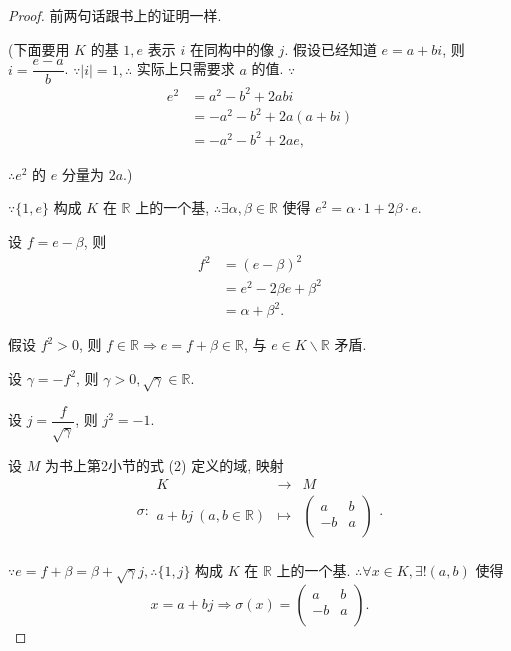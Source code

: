 \documentclass[UTF8]{ctexart}
\begin{document}
\begin{proof}
    前两句话跟书上的证明一样.

    (下面要用 $K$ 的基 $1,e$ 表示 $i$ 在同构中的像 $j$. 假设已经知道 $e=a+bi$, 则 $i=\dfrac{e-a}{b}$. $\because|i|=1,\therefore$ 实际上只需要求 $a$ 的值. $\because$
    \begin{align*}
        e^2 & =a^2-b^2+2abi \\
        & =-a^2-b^2+2a(a+bi) \\
        & =-a^2-b^2+2ae,
    \end{align*}

    $\therefore e^2$ 的 $e$ 分量为 $2a$.)

    $\because\{1,e\}$ 构成 $K$ 在 $\mathbb{R}$ 上的一个基, $\therefore\exists\alpha,\beta\in\mathbb{R}$ 使得 $e^2=\alpha\cdot1+2\beta\cdot e$.

    设 $f=e-\beta$, 则
    \begin{align*}
        f^2 & =(e-\beta)^2 \\
        & =e^2-2\beta e+\beta^2 \\
        & =\alpha+\beta^2.
    \end{align*}

    假设 $f^2>0$, 则 $f\in\mathbb{R}\Rightarrow e=f+\beta\in\mathbb{R}$, 与 $e\in K\backslash\mathbb{R}$ 矛盾.

    设 $\gamma=-f^2$, 则 $\gamma>0,\sqrt{\gamma}\in\mathbb{R}$.

    设 $j=\dfrac{f}{\sqrt{\gamma}}$, 则 $j^2=-1$.

    设 $M$ 为书上第2小节的式 (2) 定义的域, 映射
    \[\sigma:\begin{array}{rcl}
        K & \to & M \\[6pt]
        a+bj\ (a,b\in\mathbb{R}) & \mapsto & \begin{pmatrix}
            a & b \\
            -b & a \\
        \end{pmatrix} \\
    \end{array}.\]

    $\because e=f+\beta=\beta+\sqrt{\gamma}j,\therefore\{1,j\}$ 构成 $K$ 在 $\mathbb{R}$ 上的一个基. $\therefore\forall x\in K,\exists!(a,b)$ 使得
    \[x=a+bj\Rightarrow\sigma(x)=\begin{pmatrix}
            a & b \\
            -b & a \\
        \end{pmatrix}.\]


\end{proof}
\end{document}
